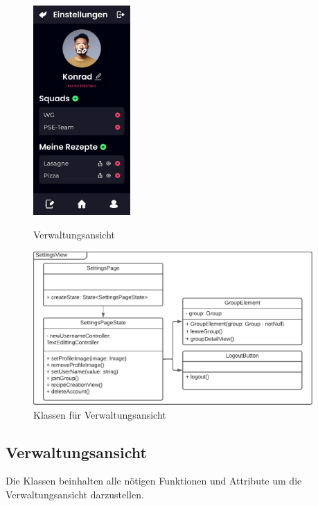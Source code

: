 \documentclass{entwurfsheft}
\begin{document}
    \begin{figure}[htp]
        \begin{minipage}
            [t]{0.49\textwidth}
            \centering
            \includegraphics[height=80mm]{images/Presentation-layer/SettingsView.jpg}
            \caption{Verwaltungsansicht}
        \end{minipage}
        \begin{minipage}
            [t]{0.49\textwidth}
            \centering
            \includegraphics[width=0.95\textwidth]{images/Presentation-layer/SettingsViewClass.pdf}
            \caption{Klassen für Verwaltungsansicht}
        \end{minipage}
    \end{figure} 
        
    \newpage

\subsection{Verwaltungsansicht}
Die Klassen beinhalten alle nötigen Funktionen und Attribute um die Verwaltungsansicht darzustellen.
\end{document}
